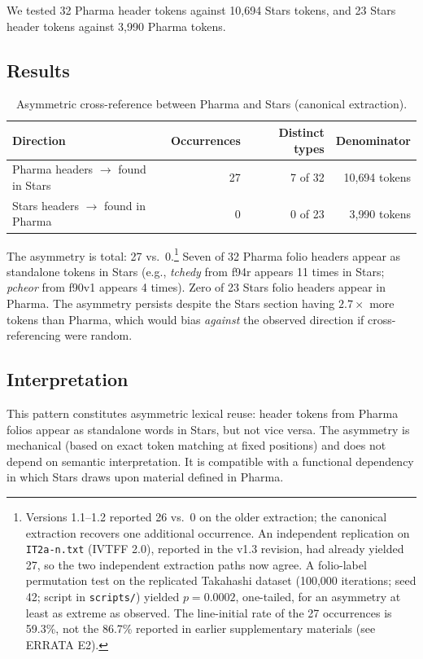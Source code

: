 \documentclass[11pt,a4paper]{article}
\begin{document}
We tested 32 Pharma header tokens against 10{,}694 Stars tokens, and 23 Stars header tokens against 3{,}990 Pharma tokens.

\subsection{Results}

\begin{table}[H]
\centering
\small
\begin{tabular}{lrrr}
\toprule
\textbf{Direction} & \textbf{Occurrences} & \textbf{Distinct types} & \textbf{Denominator} \\
\midrule
Pharma headers $\to$ found in Stars & 27 & 7 of 32 & 10{,}694 tokens \\
Stars headers $\to$ found in Pharma &  0 & 0 of 23 &  3{,}990 tokens \\
\bottomrule
\end{tabular}
\caption{Asymmetric cross-reference between Pharma and Stars (canonical extraction).}
\end{table}

The asymmetry is total: 27 vs.\ 0.\footnote{Versions 1.1--1.2 reported 26 vs.\ 0 on the older extraction; the canonical extraction recovers one additional occurrence. An independent replication on \texttt{IT2a-n.txt} (IVTFF 2.0), reported in the v1.3 revision, had already yielded 27, so the two independent extraction paths now agree. A folio-label permutation test on the replicated Takahashi dataset (100{,}000 iterations; seed 42; script in \texttt{scripts/}) yielded $p = 0.0002$, one-tailed, for an asymmetry at least as extreme as observed. The line-initial rate of the 27 occurrences is 59.3\%, not the 86.7\% reported in earlier supplementary materials (see ERRATA E2).} Seven of 32 Pharma folio headers appear as standalone tokens in Stars (e.g., \textit{tchedy} from f94r appears 11 times in Stars; \textit{pcheor} from f90v1 appears 4 times). Zero of 23 Stars folio headers appear in Pharma. The asymmetry persists despite the Stars section having $2.7\times$ more tokens than Pharma, which would bias \textit{against} the observed direction if cross-referencing were random.

\subsection{Interpretation}

This pattern constitutes asymmetric lexical reuse: header tokens from Pharma folios appear as standalone words in Stars, but not vice versa. The asymmetry is mechanical (based on exact token matching at fixed positions) and does not depend on semantic interpretation. It is compatible with a functional dependency in which Stars draws upon material defined in Pharma.
\end{document}
